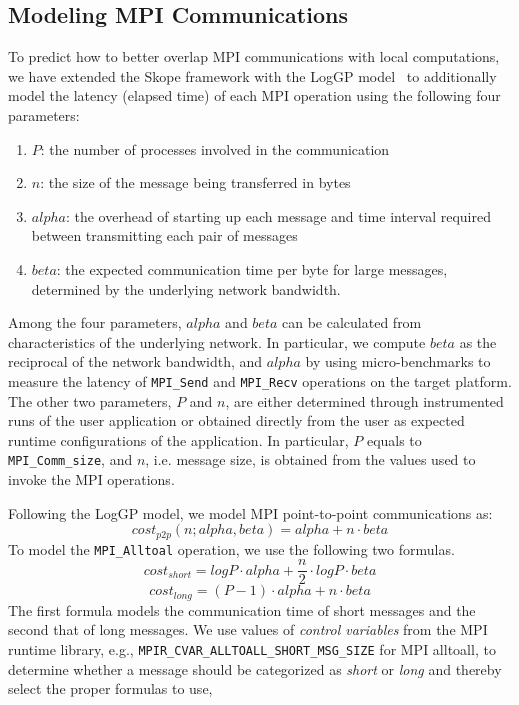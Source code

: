 \subsection{Modeling MPI Communications}

To predict how to better overlap MPI communications with local computations, we have extended the Skope framework
with the LogGP model~\cite{loggp} to additionally model the latency (elapsed time) of each MPI operation using the following four parameters:
  \begin{enumerate}
  \item $P$: the number of processes involved in the communication %
  \item $n$: the size of the message being transferred in bytes
  \item $alpha$: the overhead of starting up each message and time interval required between transmitting each pair of messages
  \item $beta$:  the expected communication time per byte for large messages,  determined by the underlying network bandwidth.
\end{enumerate}
Among the four parameters, $alpha$ and $beta$ can be calculated from characteristics of the underlying network.
In particular, we compute $beta$ as the reciprocal of the network bandwidth,  and $alpha$ by using micro-benchmarks to measure the latency of \texttt{MPI\_Send} and \texttt{MPI\_Recv} operations on the target platform.
The other two parameters,  $P$ and $n$, are either determined through instrumented runs of the user application or obtained directly from the user as expected runtime configurations of the application.
 In particular, $P$ equals to \texttt{MPI\_Comm\_size},  and $n$, i.e. message size, is obtained from the values used to invoke the MPI operations.

Following the LogGP model, we model MPI point-to-point communications as:
\begin{equation}
cost_{p2p}(n;alpha,beta) = alpha + n\cdot beta
\end{equation}
To model the \texttt{MPI\_Alltoal} operation,  we use the following two formulas.
\begin{equation}
  cost_{short} = log P\cdot alpha + \frac{n}{2}\cdot log P\cdot beta
\end{equation}
\begin{equation}
cost_{long} = (P-1)\cdot alpha + n\cdot beta
\end{equation}
The first formula models the communication time of short messages and the second that of long messages.
We use values of \emph{control variables} from  the MPI runtime library,  e.g., \texttt{MPIR\_CVAR\_ALLTOALL\_SHORT\_MSG\_SIZE} for MPI alltoall,
to determine whether a message should be categorized as {\em short} or {\em long} and thereby select the proper formulas to use,

